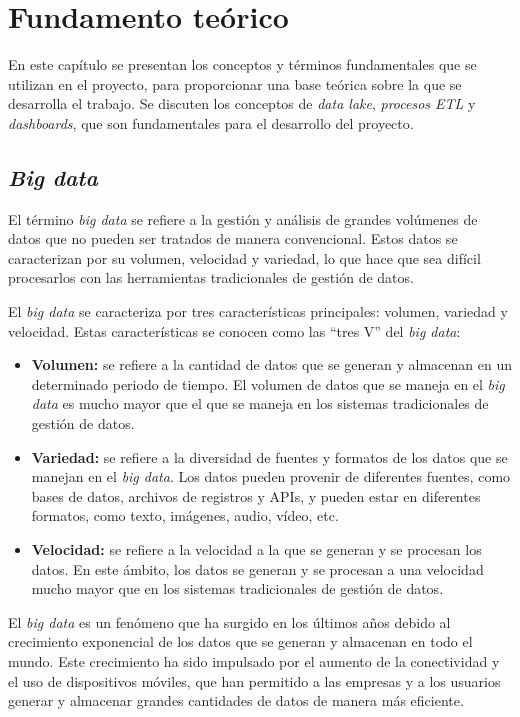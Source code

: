 \chapter{Fundamento teórico}\label{chap:teo}
En este capítulo se presentan los conceptos y términos fundamentales que se utilizan en el
proyecto, para proporcionar una base teórica sobre la que se desarrolla el trabajo. Se discuten
los conceptos de \textit{data lake}, \textit{procesos ETL} y \textit{dashboards}, que son
fundamentales para el desarrollo del proyecto.

\section{\textit{Big data}}\label{sec:bigdata}
El término \textit{big data} se refiere a la gestión y análisis de grandes volúmenes de datos
que no pueden ser tratados de manera convencional. Estos datos se caracterizan por su volumen,
velocidad y variedad, lo que hace que sea difícil procesarlos con las herramientas tradicionales
de gestión de datos.

El \textit{big data} se caracteriza por tres características principales: volumen, variedad y
velocidad. Estas características se conocen como las ``tres V'' del \textit{big data}:

\begin{itemize}
	\item \textbf{Volumen:} se refiere a la cantidad de datos que se generan y almacenan en un
		determinado periodo de tiempo. El volumen de datos que se maneja en el \textit{big data}
		es mucho mayor que el que se maneja en los sistemas tradicionales de gestión de datos.
	\item \textbf{Variedad:} se refiere a la diversidad de fuentes y formatos de los datos que
		se manejan en el \textit{big data}. Los datos pueden provenir de diferentes fuentes, como
		bases de datos, archivos de registros y APIs, y pueden estar en diferentes formatos, como
		texto, imágenes, audio, vídeo, etc.
	\item \textbf{Velocidad:} se refiere a la velocidad a la que se generan y se procesan los
		datos. En este ámbito, los datos se generan y se procesan a una velocidad mucho
		mayor que en los sistemas tradicionales de gestión de datos.
\end{itemize}

El \textit{big data} es un fenómeno que ha surgido en los últimos años debido al crecimiento
exponencial de los datos que se generan y almacenan en todo el mundo. Este crecimiento ha
sido impulsado por el aumento de la conectividad y el uso de dispositivos móviles, que han
permitido a las empresas y a los usuarios generar y almacenar grandes cantidades de datos
de manera más eficiente.


